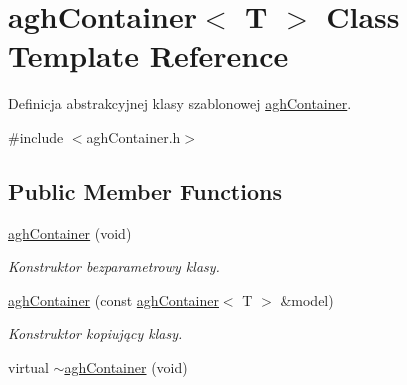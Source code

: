 \hypertarget{classaghContainer}{\section{agh\-Container$<$ \-T $>$ \-Class \-Template \-Reference}
\label{classaghContainer}
}


\-Definicja abstrakcyjnej klasy szablonowej \hyperlink{classaghContainer}{agh\-Container}.  




{\ttfamily \#include $<$agh\-Container.\-h$>$}

\subsection*{\-Public \-Member \-Functions}
\begin{DoxyCompactItemize}
\item 
\hypertarget{classaghContainer_ac0f5a167be8bbca19aa39bcf4ffeb318}{\hyperlink{classaghContainer_ac0f5a167be8bbca19aa39bcf4ffeb318}{agh\-Container} (void)}\label{classaghContainer_ac0f5a167be8bbca19aa39bcf4ffeb318}

\begin{DoxyCompactList}\small\item\em \-Konstruktor bezparametrowy klasy. \end{DoxyCompactList}\item 
\hyperlink{classaghContainer_a1234d24abf2d80b7c938d068ff74f757}{agh\-Container} (const \hyperlink{classaghContainer}{agh\-Container}$<$ \-T $>$ \&model)
\begin{DoxyCompactList}\small\item\em \-Konstruktor kopiujący klasy. \end{DoxyCompactList}\item 
\hypertarget{classaghContainer_a931410c219dbcf48363d338e8a9449f7}{virtual \hyperlink{classaghContainer_a931410c219dbcf48363d338e8a9449f7}{$\sim$agh\-Container} (void)}\label{classaghContainer_a931410c219dbcf48363d338e8a9449f7}


\end{DoxyCompactItemize}
